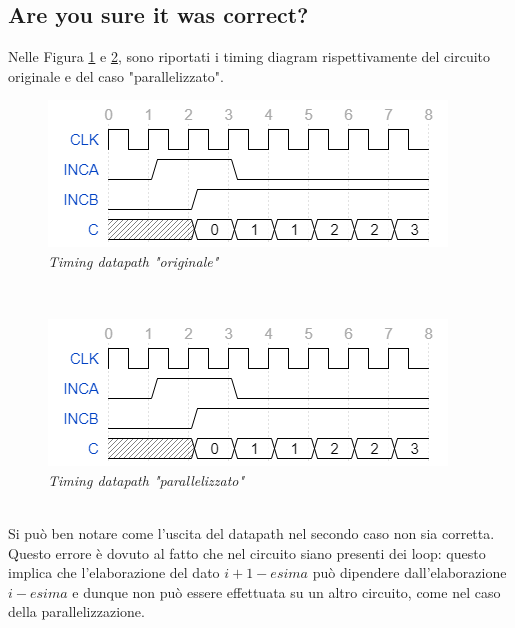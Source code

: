 \subsection{Are you sure it was correct?}
Nelle Figura \ref{Timing3_1} e \ref{Timing3_2}, sono riportati i timing diagram rispettivamente del circuito originale e del caso "parallelizzato".
\begin{figure}[!htb]
	\centering
	\includegraphics[scale=2]{immagini/3_timing2}
	\caption{\textit{Timing datapath "originale"}}
	\label{Timing3_1}
\end{figure}\\
\begin{figure}[!htb]
	\centering
	\includegraphics[scale=2]{immagini/3_timing2}
	\caption{\textit{Timing datapath "parallelizzato"}}
	\label{Timing3_2}
\end{figure}\\
Si può ben notare come l'uscita del datapath nel secondo caso non sia corretta. Questo errore è dovuto al fatto che nel circuito siano presenti dei loop: questo implica che l'elaborazione del dato $i+1-esima$ può dipendere dall'elaborazione $i-esima$ e dunque non può essere effettuata su un altro circuito, come nel caso della parallelizzazione.





